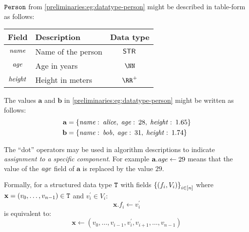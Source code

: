 \begin{example}\label{preliminaries:eg:datatype-person-table}
  ${\mathtt{Person}}$ from \cref{preliminaries:eg:datatype-person} might be described in table-form as follows:
  \begin{table}[H]
    \centering
    \begin{tabular}{cp{15em}c}
      Field                & Description        & Data type \\ \toprule
      $\mathit{name}$   & Name of the person & $\mathsf{STR}{}$ \\ \midrule
      $\mathit{age}$    & Age in years       & $\NN$ \\ \midrule
      $\mathit{height}$ & Height in meters   & $\RR^+$ \\ \midrule
    \end{tabular}
  \end{table}
\end{example}

\begin{example}\label{preliminaries:eg:datatype-person-value-with-field-names}
  The values $\mathbf{a}$ and $\mathbf{b}$ in \cref{preliminaries:eg:datatype-person} might be written as follows:
  \begin{align*}
    \mathbf{a} &=
    \{\mathit{name}:\: \mathit{alice}, \; \mathit{age}:\: 28, \; \mathit{height}:\: 1.65\} \\
    \mathbf{b} &=
    \{\mathit{name}:\: \mathit{bob}, \; \mathit{age}:\: 31, \; \mathit{height}:\: 1.74\}
  \end{align*}
\end{example}

\begin{remark}\label{preliminaries:rem:dot-assignment}
  The ``dot'' operators may be used in algorithm descriptions to indicate \emph{assignment to a specific component}. For example $\mathbf{a}.\mathit{age} \gets 29$ means that the value of the $\mathit{age}$ field of $\mathbf{a}$ is replaced by the value $29$.

  Formally, for a structured data type ${\mathtt{T}}$ with fields $\left\{{(f_i, V_i)}\right\}_{i \in [n]}$ where $\mathbf{x} = (v_0, \ldots, v_{n-1}) \in {\mathtt{T}}$ and $v_i^\prime \in V_i$:
  \[
    \mathbf{x}.f_i \gets v_i^\prime
  \]
  is equivalent to:
  \[
    \mathbf{x} \gets (v_0, \ldots, v_{i-1}, v_i^\prime, v_{i+1}, \ldots, v_{n-1})
  \]
\end{remark}

